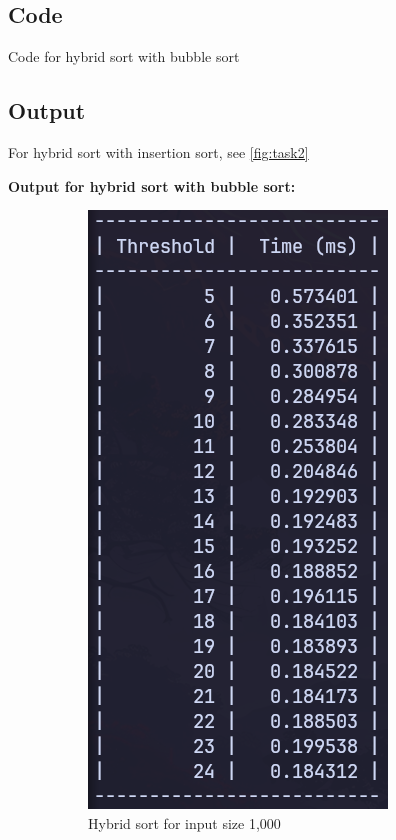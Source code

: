 \subsection{Code}
\begin{code}
    \label{code:bubble}
    \caption{Code for hybrid sort with bubble sort}
\end{code}

\subsection{Output}
For hybrid sort with insertion sort, see \cref{fig:task2}

\textbf{Output for hybrid sort with bubble sort:}
\begin{figure}[H]
    \centering
    \begin{subfigure}[t]{0.4\textwidth}
        \centering
        \includegraphics[scale=0.4]{img/task4/hb-1000.png}
        \caption{Hybrid sort for input size 1,000}
    \end{subfigure}
    \hfill
    \begin{subfigure}[t]{0.4\textwidth}

\end{subfigure}
\end{figure}
